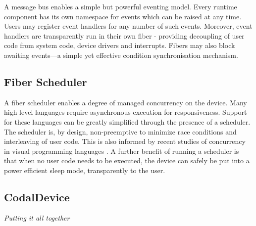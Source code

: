 A message bus enables a simple but powerful eventing model. Every runtime component has its own namespace for events
which can be raised at any time. Users may register event handlers for any number of such events. Moreover, event handlers
are transparently run in their own fiber - providing decoupling of user code from system code, device drivers and interrupts.
Fibers may also block awaiting events---a simple yet effective condition synchronisation mechanism.


\subsection{Fiber Scheduler}

A fiber scheduler enables a degree of managed concurrency on the device. Many high level languages require asynchronous
execution for responsiveness. Support for these languages can be greatly simplified through the presence of a scheduler. 
The scheduler is, by design, non-preemptive to minimize race conditions and interleaving of user code. This is also informed
by recent studies of concurrency in visual programming languages \cite{meerbaum2013learning}. A further benefit of running a 
scheduler is that when no user code needs to be executed, the device can safely be put into a power efficient sleep mode,
transparently to the user.

\subsection{CodalDevice}

\emph{Putting it all together}